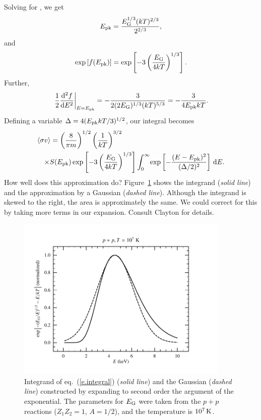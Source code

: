 Solving for \Epk, we get
\[
E_{\mathrm{pk}} = \frac{E_{\mathrm{G}}^{1/3}(kT)^{2/3}}{2^{2/3}},
\]
and 
\[ \exp\left[f(E_{\mathrm{pk}})\right] = \exp\left[-3\left(\frac{E_{\mathrm{G}}}{4kT}\right)^{1/3}\right].
\]
Further,
\[
\left.\frac{1}{2}\frac{\mathrm{d}^{2}f}{\mathrm{d} E^{2}}\right|_{E=E_{\mathrm{pk}}} = -\frac{3}{2(2E_{\mathrm{G}})^{1/3}(kT)^{5/3}} = -\frac{3}{4E_{\mathrm{pk}} kT}.
\]
Defining a variable $\Delta = 4(E_{\mathrm{pk}} kT/3)^{1/2}$, our integral becomes
\begin{eqnarray}\label{e.integral2}
\lefteqn{\langle\sigma v\rangle = \left(\frac{8}{\pi m}\right)^{1/2}\left(\frac{1}{kT}\right)^{3/2}}\nonumber\\
&&\times S(\Epk)
  \exp\left[-3\left(\frac{\EG}{4kT}\right)^{1/3}\right]
  \int_{0}^{\infty}\!\exp\left[-\frac{(E-\Epk)^{2}}{(\Delta/2)^{2}}\right]\,\dif E.
\end{eqnarray}
How well does this approximation do?  Figure~\ref{f.integrand} shows the integrand (\emph{solid line}) and the approximation by a Gaussian (\emph{dashed line}).  Although the integrand is skewed to the right, the area is approximately the same.  We could correct for this by taking more terms in our expansion. Consult Clayton for details.

\begin{figure}[htbp]
\includegraphics[width=4in]{plots_out/coulomb_integrand}
\caption{Integrand of eq.~(\protect\ref{e.integral}) (\emph{solid line}) and the Gaussian (\emph{dashed line}) constructed by expanding to second order the argument of the exponential. The parameters for $E_{\mathrm{G}}$ were taken from the $p+p$ reactions ($Z_{1}Z_{2}=1$, $A = 1/2$), and the temperature is $10^{7}\,\mathrm{K}$.}
\label{f.integrand}
\end{figure}

